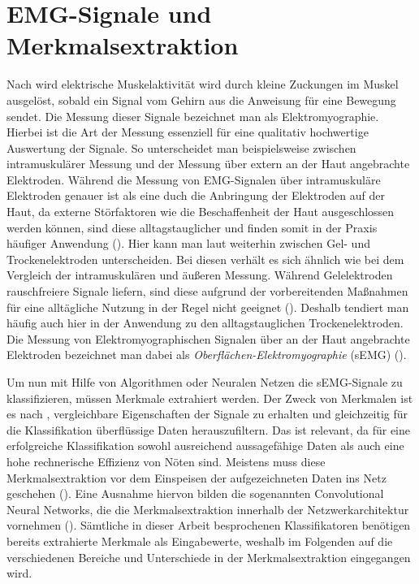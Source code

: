 \chapter{EMG-Signale und Merkmalsextraktion}
\label{chap:emg}


Nach \cite{bischoff2015emg} wird elektrische Muskelaktivität wird durch kleine Zuckungen im Muskel ausgelöst, sobald ein Signal vom Gehirn aus die Anweisung für eine Bewegung sendet. Die Messung dieser Signale bezeichnet man als Elektromyographie. Hierbei ist die Art der Messung essenziell für eine qualitativ hochwertige Auswertung der Signale. So unterscheidet man beispielsweise zwischen intramuskulärer Messung und der Messung über extern an der Haut angebrachte Elektroden. Während die Messung von EMG-Signalen über intramuskuläre Elektroden genauer ist als eine duch die Anbringung der Elektroden auf der Haut, da externe Störfaktoren wie die Beschaffenheit der Haut ausgeschlossen werden können, sind diese alltagstauglicher und finden somit in der Praxis häufiger Anwendung (\cite{bischoff2015emg}). Hier kann man laut \cite{Allard2019} weiterhin zwischen Gel- und Trockenelektroden unterscheiden. Bei diesen verhält es sich ähnlich wie bei dem Vergleich der intramuskulären und äußeren Messung. Während Gelelektroden rauschfreiere Signale liefern, sind diese aufgrund der vorbereitenden Maßnahmen für eine alltägliche Nutzung in der Regel nicht geeignet (\cite{Allard2019}). Deshalb tendiert man häufig auch hier in der Anwendung zu den alltagstauglichen Trockenelektroden. Die Messung von Elektromyographischen Signalen über an der Haut angebrachte Elektroden bezeichnet man dabei als \textit{Oberflächen-Elektromyographie} (sEMG) (\cite{bischoff2015emg}).

Um nun mit Hilfe von Algorithmen oder Neuralen Netzen die sEMG-Signale zu klassifizieren, müssen Merkmale extrahiert werden. Der Zweck von Merkmalen ist es nach \cite{zecca2002control}, vergleichbare Eigenschaften der Signale zu erhalten und gleichzeitig für die Klassifikation überflüssige Daten herauszufiltern. Das ist relevant, da für eine erfolgreiche Klassifikation sowohl ausreichend aussagefähige Daten als auch eine hohe rechnerische Effizienz von Nöten sind.  Meistens muss diese Merkmalsextraktion vor dem Einspeisen der aufgezeichneten Daten ins Netz geschehen (\cite{zecca2002control}). Eine Ausnahme hiervon bilden die sogenannten Convolutional Neural Networks, die die Merkmalsextraktion innerhalb der Netzwerkarchitektur vornehmen (\cite{Allard2019}). Sämtliche in dieser Arbeit besprochenen Klassifikatoren benötigen bereits extrahierte Merkmale als Eingabewerte, weshalb im Folgenden auf die verschiedenen Bereiche und Unterschiede in der Merkmalsextraktion eingegangen wird.

